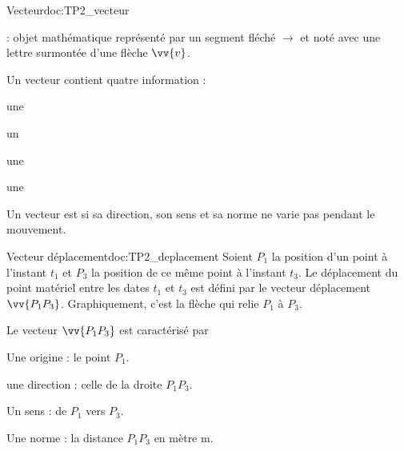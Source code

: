 \begin{doc}{Vecteur}{doc:TP2_vecteur}
  \begin{importants}
     : objet mathématique représenté par un segment fléché $\longrightarrow$ et noté avec une lettre surmontée d'une flèche $\vv{v}$.
    
    Un vecteur contient quatre information : 
    
    \vspace*{-4pt}
    \begin{listePoints}[2]
      \item une 
      \item un 
      \item une 
      \item une 
    \end{listePoints}
    \vspace*{-4pt}
  
    Un vecteur est  si sa direction, son sens et sa norme ne varie pas pendant le mouvement.
  \end{importants}
\end{doc}

\pasCorrection{
  \newpage
  \vspace*{-40pt}
}
\begin{doc}{Vecteur déplacement}{doc:TP2_deplacement}
  Soient $P_1$ la position d'un point à l'instant $t_1$ et $P_3$ la position de ce même point à l'instant $t_3$.
  Le déplacement du point matériel entre les dates $t_1$ et $t_3$ est défini par le vecteur déplacement $\vv{P_1 P_3}$.
  Graphiquement, c'est la flèche qui relie $P_1$ à $P_3$. 
  
  Le vecteur $\vv{P_1 P_3}$ est caractérisé par
  \vspace*{-8pt}
  \begin{listePoints}[2]
    \item Une origine : le point $P_1$.
    \item une direction : celle de la droite $P_1 P_3$.
    \item Un sens : de $P_1$ vers $P_3$.
    \item Une norme : la distance $P_1 P_3$ en mètre \unit{m}.
  \end{listePoints}
\end{doc}

